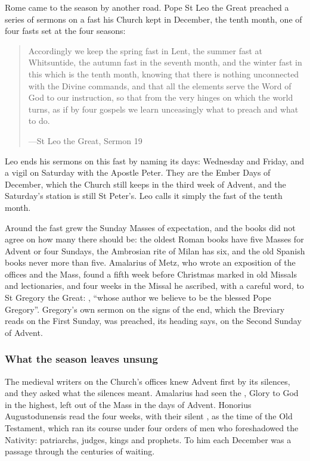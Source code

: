 Rome came to the season by another road. Pope St Leo the Great preached a
series of sermons on a fast his Church kept in December, the tenth month, one of
four fasts set at the four seasons:

\begin{quote}
Accordingly we keep the spring fast in Lent, the summer fast at Whitsuntide, the
autumn fast in the seventh month, and the winter fast in this which is the tenth
month, knowing that there is nothing unconnected with the Divine commands, and
that all the elements serve the Word of God to our instruction, so that from the
very hinges on which the world turns, as if by four gospels we learn unceasingly
what to preach and what to do.\par
{\smallskip\noindent\small ---St Leo the Great, Sermon 19\par}
\end{quote}

Leo ends his sermons on this fast by naming its days: Wednesday and Friday, and a
vigil on Saturday with the Apostle Peter. They are the Ember Days of December,
which the Church still keeps in the third week of Advent, and the Saturday's
station is still St Peter's. Leo calls it simply the fast of the tenth month.

Around the fast grew the Sunday Masses of expectation, and the
books did not agree on how many there should be: the oldest Roman books have
five Masses for Advent or four Sundays, the Ambrosian rite of Milan has six, and
the old Spanish books never more than five. Amalarius of Metz, who wrote an
exposition of the offices and the Mass, found a fifth week before Christmas
marked in old Missals and lectionaries, and four weeks in the Missal he
ascribed, with a careful word, to St Gregory the Great: , ``whose author we believe to be the
blessed Pope Gregory''. Gregory's own sermon on the signs of the end, which the
Breviary reads on the First Sunday, was preached, its heading says, on the
Second Sunday of Advent.

\subsubsection*{What the season leaves unsung}

The medieval writers on the Church's offices knew Advent first by its silences,
and they asked what the silences meant. Amalarius had seen the , Glory to God in the highest, left out of the Mass in the days of
Advent. Honorius Augustodunensis read the four weeks, with their silent
, as the time of the Old Testament, which ran its course under
four orders of men who foreshadowed the Nativity: patriarchs, judges, kings and
prophets. To him each December was a passage through the centuries of waiting.

